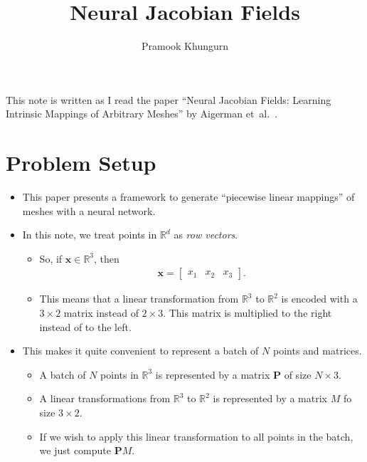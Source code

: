 \documentclass[10pt]{article}
\title{Neural Jacobian Fields}
\author{Pramook Khungurn}
\newcommand{\ve}[1]{\mathbf{#1}}
\newcommand{\etal}{{et~al.}}
\newcommand{\Real}{\mathbb{R}}
\begin{document}
\maketitle


This note is written as I read the paper ``Neural Jacobian Fields: Learning Intrinsic Mappings of Arbitrary Meshes'' by Aigerman \etal~\cite{Aigerman:2022}.

\section{Problem Setup}

\begin{itemize}
    \item This paper presents a framework to generate ``piecewise linear mappings'' of meshes with a neural network.
    
    \item In this note, we treat points in $\Real^d$ as \emph{row vectors}.
    \begin{itemize}
        \item So, if $\ve{x} \in \Real^3$, then
        \begin{align*}
            \ve{x} = \begin{bmatrix}
                x_1 & x_2 & x_3
            \end{bmatrix}.
        \end{align*}

        \item This means that a linear transformation from $\Real^3$ to $\Real^2$ is encoded with a $3 \times 2$ matrix instead of $2 \times 3$. This matrix is multiplied to the right instead of to the left.
    \end{itemize}

    \item This makes it quite convenient to represent a batch of $N$ points and matrices.
    \begin{itemize}
        \item A batch of $N$ points in $\Real^3$ is represented by a matrix $\ve{P}$ of size $N \times 3$.
        \item A linear transformations from $\Real^3$ to $\Real^2$ is represented by a matrix $M$ fo size $3 \times 2$.
        \item If we wish to apply this linear transformation to all points in the batch, we just compute $\ve{P} M$.
    \end{itemize}    
\end{itemize}
\end{document}
